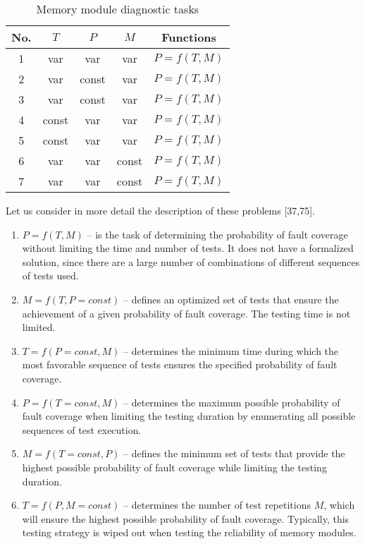 \documentclass[12pt]{article}
\begin{document}
\captionsetup[table]{skip=0pt,singlelinecheck=off}
\begin{table}[h!]
\caption{Memory module diagnostic tasks}
\label{memory}
\begin{center} 
    \def\arraystretch{1.2}
    \begin{tabular}{|c|c|c|c|c|}
        \hline
        No. & $T$ & $P$ & $M$ & Functions \\
        \hline
        1 & var & var & var & $P = f(T, M)$\\
        \hline
        2 & var & const & var & $P = f(T, M)$\\
        \hline
        3 & var & const & var & $P = f(T, M)$\\
        \hline
        4 & const & var & var & $P = f(T, M)$\\
        \hline
        5 & const & var & var & $P = f(T, M)$\\
        \hline
        6 & var & var & const & $P = f(T, M)$\\
        \hline
        7 & var & var & const & $P = f(T, M)$\\
        \hline
        \end{tabular}
    \end{center}
\end{table}

Let us consider in more detail the description of these problems [37,75].

\begin{enumerate}
\item $P = f(T, M)$ – is the task of determining the probability of fault \mbox{coverage} without limiting the time and number of tests. It does not have a formalized solution, since there are a large number of combinations of different sequences of
tests used.\newline
\item $M = f(T, P = const)$ – defines an optimized set of tests that ensure the achievement of a given probability of fault coverage. The testing time is not limited.\newline
\item $T = f(P = const, M)$ – determines the minimum time during which the most favorable sequence of tests ensures the specified probability of fault coverage.\newline
\item $P = f(T = const, M)$ – determines the maximum possible probability of fault coverage when limiting the testing duration by enumerating all possible sequences of test execution.\newline
\item $M = f(T = const, P)$ – defines the minimum set of tests that provide the highest possible probability of fault coverage while limiting the testing duration.\newline
\item $T = f(P, M=const)$ – determines the number of test repetitions $M$, which will ensure the highest possible probability of fault coverage. Typically, this testing strategy is wiped out when testing the reliability of memory modules.
\end{enumerate}
\end{document}
